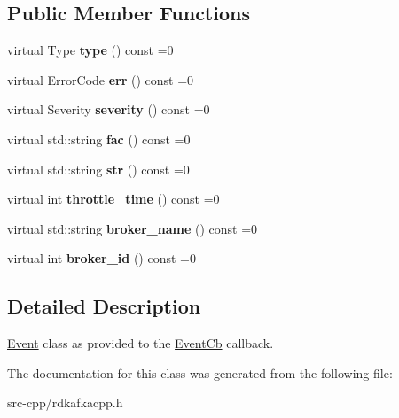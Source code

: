\subsection*{Public Member Functions}
\begin{DoxyCompactItemize}
\item 
\hypertarget{classRdKafka_1_1Event_a8bf41860541c6549cccd298b0a4ceb6e}{virtual Type {\bfseries type} () const =0}\label{classRdKafka_1_1Event_a8bf41860541c6549cccd298b0a4ceb6e}

\item 
\hypertarget{classRdKafka_1_1Event_a6631f15dccbf775a3fa43a1aba8828ab}{virtual Error\-Code {\bfseries err} () const =0}\label{classRdKafka_1_1Event_a6631f15dccbf775a3fa43a1aba8828ab}

\item 
\hypertarget{classRdKafka_1_1Event_ab98e758dea9aa13eb1421f625e206b16}{virtual Severity {\bfseries severity} () const =0}\label{classRdKafka_1_1Event_ab98e758dea9aa13eb1421f625e206b16}

\item 
\hypertarget{classRdKafka_1_1Event_a60dbe2545a614b2706594d384156dfa4}{virtual std\-::string {\bfseries fac} () const =0}\label{classRdKafka_1_1Event_a60dbe2545a614b2706594d384156dfa4}

\item 
\hypertarget{classRdKafka_1_1Event_a94f84a103b017b21d7ede84fbbf9d7ed}{virtual std\-::string {\bfseries str} () const =0}\label{classRdKafka_1_1Event_a94f84a103b017b21d7ede84fbbf9d7ed}

\item 
\hypertarget{classRdKafka_1_1Event_a21be0397c0bc18657d90341a1eeb1db5}{virtual int {\bfseries throttle\-\_\-time} () const =0}\label{classRdKafka_1_1Event_a21be0397c0bc18657d90341a1eeb1db5}

\item 
\hypertarget{classRdKafka_1_1Event_a3295812d6be66d4f601ca7055a26f9ef}{virtual std\-::string {\bfseries broker\-\_\-name} () const =0}\label{classRdKafka_1_1Event_a3295812d6be66d4f601ca7055a26f9ef}

\item 
\hypertarget{classRdKafka_1_1Event_ac4355a247e321448d3ae29655da7b724}{virtual int {\bfseries broker\-\_\-id} () const =0}\label{classRdKafka_1_1Event_ac4355a247e321448d3ae29655da7b724}

\end{DoxyCompactItemize}


\subsection{Detailed Description}
\hyperlink{classRdKafka_1_1Event}{Event} class as provided to the \hyperlink{classRdKafka_1_1EventCb}{Event\-Cb} callback. 

The documentation for this class was generated from the following file\-:\begin{DoxyCompactItemize}
\item 
src-\/cpp/rdkafkacpp.\-h\end{DoxyCompactItemize}

